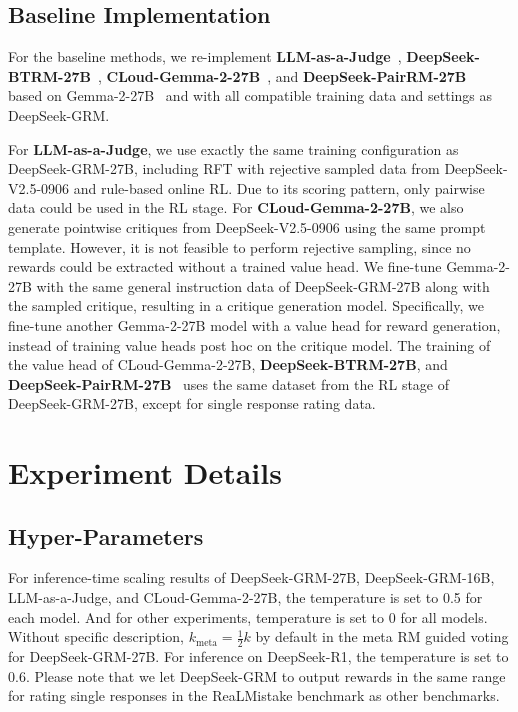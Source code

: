 \documentclass{article} %
\newcommand{\SGRM}{DeepSeek-GRM-27B\xspace}
\newcommand{\SGRMAll}{DeepSeek-GRM\xspace}
\newcommand{\SGRMSmall}{DeepSeek-GRM-16B\xspace}
\newcommand{\BTRM}{DeepSeek-BTRM\xspace}
\newcommand{\PairRM}{DeepSeek-PairRM\xspace}
\begin{document}
\subsection{Baseline Implementation}

For the baseline methods, we re-implement \textbf{LLM-as-a-Judge}~\citep{chatbot-arena}, \textbf{\BTRM-27B}~\citep{0627eaad-0ecb-353b-9c3d-81e29de3658f}, \textbf{CLoud-Gemma-2-27B}~\citep{ankner2024critiqueoutloudrewardmodels}, and \textbf{\PairRM-27B}~\citep{jiang-etal-2023-llm} based on Gemma-2-27B~\citep{gemmateam2024gemma2improvingopen} and with all compatible training data and settings as \SGRMAll.

For \textbf{LLM-as-a-Judge}, we use exactly the same training configuration as \SGRM, including RFT with rejective sampled data from DeepSeek-V2.5-0906 and rule-based online RL. Due to its scoring pattern, only pairwise data could be used in the RL stage. For \textbf{CLoud-Gemma-2-27B}, we also generate pointwise critiques from DeepSeek-V2.5-0906 using the same prompt template. However, it is not feasible to perform rejective sampling, since no rewards could be extracted without a trained value head. We fine-tune Gemma-2-27B with the same general instruction data of \SGRM along with the sampled critique, resulting in a critique generation model. Specifically, we fine-tune another Gemma-2-27B model with a value head for reward generation, instead of training value heads post hoc on the critique model. The training of the value head of CLoud-Gemma-2-27B, \textbf{\BTRM-27B}, and \textbf{\PairRM-27B}~\citep{jiang-etal-2023-llm} uses the same dataset from the RL stage of \SGRM, except for single response rating data. 

\section{Experiment Details}\label{app:exp-detail}

\subsection{Hyper-Parameters}

For inference-time scaling results of \SGRM, \SGRMSmall, LLM-as-a-Judge, and CLoud-Gemma-2-27B, the temperature is set to 0.5 for each model. And for other experiments, temperature is set to 0 for all models. Without specific description, $k_{\mathrm{meta}} = \frac{1}{2} k$ by default in the meta RM guided voting for \SGRM. 
For inference on DeepSeek-R1, the temperature is set to 0.6. Please note that we let \SGRMAll to output rewards in the same range for rating single responses in the ReaLMistake benchmark as other benchmarks. 
\end{document}
